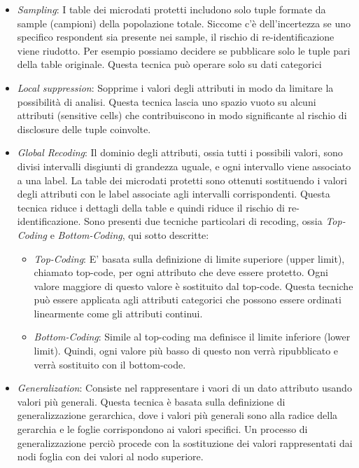 \begin{itemize}
    \item \textit{Sampling}: I table dei microdati protetti includono solo tuple formate da sample (campioni) della popolazione totale. Siccome c'è dell'incertezza se uno specifico respondent sia presente nei sample, il rischio di re-identificazione viene riudotto. Per esempio possiamo decidere se pubblicare solo le tuple pari della table originale. Questa tecnica può operare solo su dati categorici 
    
    \item \textit{Local suppression}: Sopprime i valori degli attributi in modo da limitare la possibilità di analisi. Questa tecnica lascia uno spazio vuoto su alcuni attributi (sensitive cells) che contribuiscono in modo significante al rischio di disclosure delle tuple coinvolte.
    
    \item \textit{Global Recoding}: Il dominio degli attributi, ossia tutti i possibili valori, sono divisi intervalli disgiunti di grandezza uguale, e ogni intervallo viene associato a una label. La table dei microdati protetti sono ottenuti sostituendo i valori degli attributi con le label associate agli intervalli corrispondenti. Questa tecnica riduce i dettagli della table e quindi riduce il rischio di re-identificazione. Sono presenti due tecniche particolari di recoding, ossia \textit{Top-Coding} e \textit{Bottom-Coding}, qui sotto descritte:
    \begin{itemize}
        \item \textit{Top-Coding}: E' basata sulla definizione di limite superiore (upper limit), chiamato top-code, per ogni attributo che deve essere protetto. Ogni valore maggiore di questo valore è sostituito dal top-code. Questa tecniche può essere applicata agli attributi categorici che possono essere ordinati linearmente come gli attributi continui.  
        \item \textit{Bottom-Coding}: Simile al top-coding ma definisce il limite inferiore (lower limit). Quindi, ogni valore più basso di questo non verrà ripubblicato e verrà sostituito con il bottom-code.
    \end{itemize}
    \item \textit{Generalization}: Consiste nel rappresentare i vaori di un dato attributo usando valori più generali. Questa tecnica è basata sulla definizione di generalizzazione gerarchica, dove i valori più generali sono alla radice della gerarchia e le foglie corrispondono ai valori specifici. Un processo di generalizzazione perciò procede con la sostituzione dei valori rappresentati dai nodi foglia con dei valori al nodo superiore.


\end{itemize}
